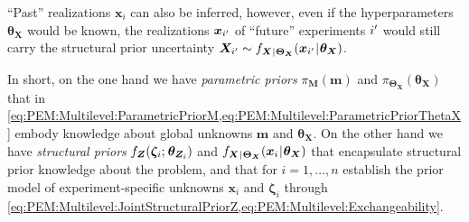 ``Past'' realizations \(\bm{x}_i\) can also be inferred, however, even if the hyperparameters \(\bm{\theta}_{\bm{X}}\) would be known, the realizations \(\bm{x}_{{i}^\prime}\) of ``future'' experiments \({i}^\prime\)
would still carry the structural prior uncertainty \(\bm{X}_{{i}^\prime} \sim f_{\bm{X} {\:\!}|{\:\!} \bm{\Theta}_{\bm{X}}} (\bm{x}_{{i}^\prime} {\:\!}|{\:\!} \bm{\theta}_{\bm{X}})\).
\par %
In short, on the one hand we have \textit{parametric priors} \(\pi_{\bm{M}} (\bm{m})\) and \(\pi_{\bm{\Theta}_{\bm{X}}} (\bm{\theta}_{\bm{X}})\)
that in \cref{eq:PEM:Multilevel:ParametricPriorM,eq:PEM:Multilevel:ParametricPriorThetaX} embody knowledge about global unknowns \(\bm{m}\) and \(\bm{\theta}_{\bm{X}}\).
On the other hand we have \textit{structural priors} \(f_{\bm{Z}}(\bm{\zeta}_i ;{\:\!} \bm{\theta}_{\bm{Z}_i})\) and
\(f_{\bm{X} {\:\!}|{\:\!} \bm{\Theta}_{\bm{X}}} (\bm{x}_i {\:\!}|{\:\!} \bm{\theta}_{\bm{X}})\) that encapsulate structural prior knowledge about the problem,
and that for \(i=1,\ldots,n\) establish the prior model of experiment-specific unknowns \(\bm{x}_i\) and \(\bm{\zeta}_i\) through \cref{eq:PEM:Multilevel:JointStructuralPriorZ,eq:PEM:Multilevel:Exchangeability}.

